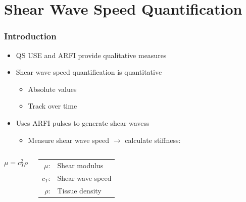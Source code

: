 \documentclass{beamer}
\begin{document}
	\section[Shear]{Shear Wave Speed Quantification}
		\begin{frame}
			\frametitle{Introduction}
			\begin{itemize}
				\item QS USE and ARFI provide \alert{qualitative} measures
				\item Shear wave speed quantification is \alert{quantitative}
				\begin{itemize}
					\item Absolute values
					\item Track over time
				\end{itemize}
				\item Uses ARFI pulses to generate shear wavess
				\begin{itemize}
					\item Measure shear wave speed $\rightarrow$ calculate stiffness:
				\end{itemize}
			\end{itemize}

			\vspace{1cm}
			\begin{columns}[c]
					\begin{equation*}
						\mu = c_T^2 \rho
					\end{equation*}

					\begin{tabular}{rl}
						$\mu$: & Shear modulus \\
						$c_T$: & Shear wave speed \\
						$\rho$: & Tissue density \\
					\end{tabular}

			\end{columns}
		\end{frame}
\end{document}
